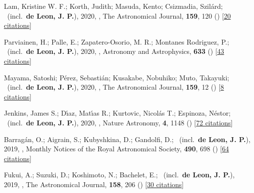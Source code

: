 \item[{\color{numcolor}\scriptsize21}] Lam, Kristine W. F.; Korth, Judith; Masuda, Kento; Csizmadia, Szil{\'a}rd; \etal\ (incl.\ \textbf{de Leon, J. P.}), 2020, , The Astronomical Journal, \textbf{159}, 120 () [\href{https://ui.adsabs.harvard.edu/abs/2020AJ....159..120L}{20 citations}]

\item[{\color{numcolor}\scriptsize20}] Parviainen, H.; Palle, E.; Zapatero-Osorio, M. R.; Montanes Rodriguez, P.; \etal\ (incl.\ \textbf{de Leon, J. P.}), 2020, , Astronomy and Astrophysics, \textbf{633} () [\href{https://ui.adsabs.harvard.edu/abs/2020A&A...633A..28P}{43 citations}]

\item[{\color{numcolor}\scriptsize19}] Mayama, Satoshi; P{\'e}rez, Sebasti{\'a}n; Kusakabe, Nobuhiko; Muto, Takayuki; \etal\ (incl.\ \textbf{de Leon, J. P.}), 2020, , The Astronomical Journal, \textbf{159}, 12 () [\href{https://ui.adsabs.harvard.edu/abs/2020AJ....159...12M}{8 citations}]

\item[{\color{numcolor}\scriptsize18}] Jenkins, James S.; D{\'\i}az, Mat{\'\i}as R.; Kurtovic, Nicol{\'a}s T.; Espinoza, N{\'e}stor; \etal\ (incl.\ \textbf{de Leon, J. P.}), 2020, , Nature Astronomy, \textbf{4}, 1148 () [\href{https://ui.adsabs.harvard.edu/abs/2020NatAs...4.1148J}{72 citations}]

\item[{\color{numcolor}\scriptsize17}] Barrag{\'a}n, O.; Aigrain, S.; Kubyshkina, D.; Gandolfi, D.; \etal\ (incl.\ \textbf{de Leon, J. P.}), 2019, , Monthly Notices of the Royal Astronomical Society, \textbf{490}, 698 () [\href{https://ui.adsabs.harvard.edu/abs/2019MNRAS.490..698B}{64 citations}]

\item[{\color{numcolor}\scriptsize16}] Fukui, A.; Suzuki, D.; Koshimoto, N.; Bachelet, E.; \etal\ (incl.\ \textbf{de Leon, J. P.}), 2019, , The Astronomical Journal, \textbf{158}, 206 () [\href{https://ui.adsabs.harvard.edu/abs/2019AJ....158..206F}{30 citations}]

